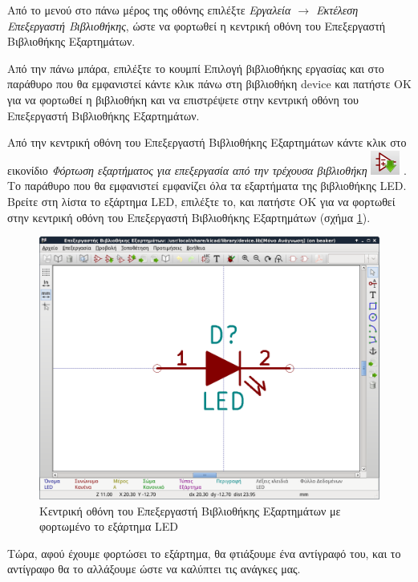 \documentclass[a4paper]{article}
\begin{document}
Από το μενού στο πάνω μέρος της οθόνης επιλέξτε \textit{Εργαλεία $\rightarrow$ Εκτέλεση Επεξεργαστή Βιβλιοθήκης}, ώστε να φορτωθεί η κεντρική οθόνη του Επεξεργαστή Βιβλιοθήκης Εξαρτημάτων.

Από την πάνω μπάρα, επιλέξτε το κουμπί Επιλογή βιβλιοθήκης εργασίας και στο παράθυρο που θα εμφανιστεί κάντε κλικ πάνω στη βιβλιοθήκη device και πατήστε ΟΚ για να φορτωθεί η βιβλιοθήκη και να επιστρέψετε στην κεντρική οθόνη του Επεξεργαστή Βιβλιοθήκης Εξαρτημάτων.

Από την κεντρική οθόνη του Επεξεργαστή Βιβλιοθήκης Εξαρτημάτων κάντε κλικ στο εικονίδιο \textit{Φόρτωση εξαρτήματος για επεξεργασία από την τρέχουσα βιβλιοθήκη} \includegraphics[scale=.5]{img/libed-ico-loadcomp.png}
. Το παράθυρο που θα εμφανιστεί εμφανίζει όλα τα εξαρτήματα της βιβλιοθήκης LED. Βρείτε στη λίστα το εξάρτημα LED, επιλέξτε το, και πατήστε ΟΚ για να φορτωθεί στην κεντρική οθόνη του Επεξεργαστή Βιβλιοθήκης Εξαρτημάτων (σχήμα \ref{fig:libed-wind-led}).

\begin{figure}
  \begin{center}
    \includegraphics[width=.9\textwidth]{img/libed-wind-led.png}
    \caption{Κεντρική οθόνη του Επεξεργαστή Βιβλιοθήκης Εξαρτημάτων με φορτωμένο το εξάρτημα LED}
    \label{fig:libed-wind-led}
  \end{center}
\end{figure}

Τώρα, αφού έχουμε φορτώσει το εξάρτημα, θα φτιάξουμε ένα αντίγραφό του, και το αντίγραφο θα το αλλάξουμε ώστε να καλύπτει τις ανάγκες μας.
\end{document}

